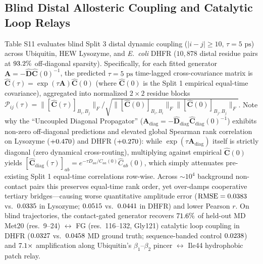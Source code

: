 \documentclass[10pt,letterpaper]{article}
\begin{document}
\subsection{Blind Distal Allosteric Coupling and Catalytic Loop Relays}
Table S11 evaluates blind Split 3 distal dynamic coupling ($|i-j|\ge 10$, $\tau = 5\text{ ps}$) across Ubiquitin, HEW Lysozyme, and \textit{E.\ coli} DHFR ($10{,}878$ distal residue pairs at $93.2{}\%$ off-diagonal sparsity). Specifically, for each fitted generator $\mathbf{A} = -\hat{\mathbf{D}}\hat{\mathbf{C}}(0)^{-1}$, the predicted $\tau = 5\text{ ps}$ time-lagged cross-covariance matrix is $\hat{\mathbf{C}}(\tau) = \exp(\tau\mathbf{A})\hat{\mathbf{C}}(0)$ (where $\hat{\mathbf{C}}(0)$ is the Split 1 empirical equal-time covariance), aggregated into normalized $2\times 2$ residue blocks $\mathcal{P}_{ij}(\tau) = \|[\hat{\mathbf{C}}(\tau)]_{B_i,B_j}\|_F / \sqrt{\|[\hat{\mathbf{C}}(0)]_{B_i,B_i}\|_F \|[\hat{\mathbf{C}}(0)]_{B_j,B_j}\|_F}$. Note why the ``Uncoupled Diagonal Propagator'' ($\mathbf{A}_{\mathrm{diag}} = -\hat{\mathbf{D}}_{\mathrm{diag}}\hat{\mathbf{C}}_{\mathrm{diag}}(0)^{-1}$) exhibits non-zero off-diagonal predictions and elevated global Spearman rank correlation on Lysozyme ($+0.470{}$) and DHFR ($+0.270{}$): while $\exp(\tau\mathbf{A}_{\mathrm{diag}})$ itself is strictly diagonal (zero dynamical cross-routing), multiplying against empirical $\hat{\mathbf{C}}(0)$ yields $[\hat{\mathbf{C}}_{\mathrm{diag}}(\tau)]_{ab} = e^{-\tau D_{aa}/C_{aa}(0)}\hat{C}_{ab}(0)$, which simply attenuates pre-existing Split 1 equal-time correlations row-wise. Across $\sim 10^4$ background non-contact pairs this preserves equal-time rank order, yet over-damps cooperative tertiary bridges---causing worse quantitative amplitude error ($\mathrm{RMSE} = 0.0383{}$ vs.\ $0.0335{}$ in Lysozyme; $0.0515{}$ vs.\ $0.0441{}$ in DHFR) and lower Pearson $r$. On blind trajectories, the contact-gated generator recovers $71.6{}\%$ of held-out MD Met20 (res.\ 9--24) $\leftrightarrow$ FG (res.\ 116--132, Gly121) catalytic loop coupling in DHFR ($0.0327{}$ vs.\ $0.0458{}$ MD ground truth; sequence-banded control $0.0238{}$) and $7.1{}\times$ amplification along Ubiquitin's $\beta_1\text{--}\beta_2$ pincer $\leftrightarrow$ Ile44 hydrophobic patch relay.
\end{document}
